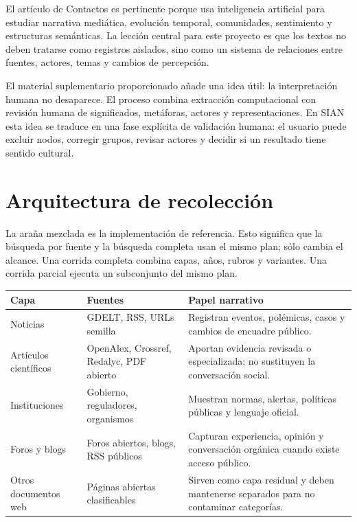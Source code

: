 \documentclass[11pt]{article}
\begin{document}
El artículo de Contactos \cite{contactos625} es pertinente porque usa inteligencia artificial para estudiar narrativa mediática, evolución temporal, comunidades, sentimiento y estructuras semánticas. La lección central para este proyecto es que los textos no deben tratarse como registros aislados, sino como un sistema de relaciones entre fuentes, actores, temas y cambios de percepción.

El material suplementario proporcionado \cite{frontierssupp} añade una idea útil: la interpretación humana no desaparece. El proceso combina extracción computacional con revisión humana de significados, metáforas, actores y representaciones. En SIAN esta idea se traduce en una fase explícita de validación humana: el usuario puede excluir nodos, corregir grupos, revisar actores y decidir si un resultado tiene sentido cultural.

\section{Arquitectura de recolección}

La araña mezclada es la implementación de referencia. Esto significa que la búsqueda por fuente y la búsqueda completa usan el mismo plan; sólo cambia el alcance. Una corrida completa combina capas, años, rubros y variantes. Una corrida parcial ejecuta un subconjunto del mismo plan.

\begin{longtable}{p{3cm}p{4cm}p{6cm}}
\toprule
Capa & Fuentes & Papel narrativo\\
\midrule
Noticias & GDELT, RSS, URLs semilla & Registran eventos, polémicas, casos y cambios de encuadre público.\\
Artículos científicos & OpenAlex, Crossref, Redalyc, PDF abierto & Aportan evidencia revisada o especializada; no sustituyen la conversación social.\\
Instituciones & Gobierno, reguladores, organismos & Muestran normas, alertas, políticas públicas y lenguaje oficial.\\
Foros y blogs & Foros abiertos, blogs, RSS públicos & Capturan experiencia, opinión y conversación orgánica cuando existe acceso público.\\
Otros documentos web & Páginas abiertas clasificables & Sirven como capa residual y deben mantenerse separados para no contaminar categorías.\\
\bottomrule
\end{longtable}
\end{document}
